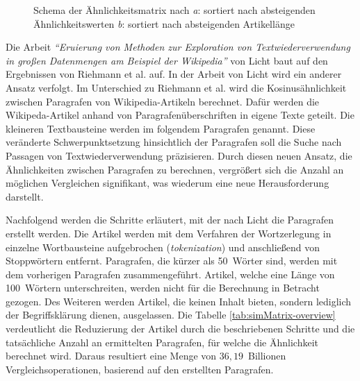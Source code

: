 
\begin{figure}
    \begin{tikzpicture}[scale=1]
    
    \end{tikzpicture}
    \caption{Schema der Ähnlichkeitsmatrix nach \cite{riehmann2016visualizing} \emph{a}: sortiert nach absteigenden Ähnlichkeitswerten \emph{b}: sortiert nach absteigenden Artikellänge}
    \label{fig:simmatrix-1}
\end{figure}


Die Arbeit \emph{"`Eruierung von Methoden zur Exploration von Textwiederverwendung in großen Datenmengen am Beispiel der Wikipedia"'} von Licht \cite{licht:2017} baut auf den Ergebnissen von Riehmann et al. \cite{riehmann2016visualizing} auf.
In der Arbeit von Licht wird ein anderer Ansatz verfolgt. Im Unterschied zu Riehmann et al. wird die Kosinusähnlichkeit zwischen Paragrafen von Wikipedia-Artikeln berechnet.
Dafür werden die Wikipeda-Artikel anhand von Paragrafenüberschriften in eigene Texte geteilt.
Die kleineren Textbausteine werden im folgendem Paragrafen genannt.
Diese veränderte Schwerpunktsetzung hinsichtlich der Paragrafen soll die Suche nach Passagen von Textwiederverwendung präzisieren.
Durch diesen neuen Ansatz, die Ähnlichkeiten zwischen Paragrafen zu berechnen, vergrößert sich die Anzahl an möglichen Vergleichen signifikant, was wiederum eine neue Herausforderung darstellt.

Nachfolgend werden die Schritte erläutert, mit der nach Licht die Paragrafen erstellt werden.
Die Artikel werden mit dem Verfahren der Wortzerlegung in einzelne Wortbausteine aufgebrochen (\emph{tokenization}) und anschließend von Stoppwörtern entfernt.
Paragrafen, die kürzer als 50~Wörter sind, werden mit dem vorherigen Paragrafen zusammengeführt. 
Artikel, welche eine Länge von 100~Wörtern unterschreiten, werden nicht für die Berechnung in Betracht gezogen.
Des Weiteren werden Artikel, die keinen Inhalt bieten, sondern lediglich der Begriffsklärung dienen, ausgelassen.
Die Tabelle \ref{tab:simMatrix-overview} verdeutlicht die Reduzierung der Artikel durch die beschriebenen Schritte und die tatsächliche Anzahl an ermittelten Paragrafen, für welche die Ähnlichkeit berechnet wird.
Daraus resultiert eine Menge von $36,19$~Billionen Vergleichsoperationen, basierend auf den erstellten Paragrafen.

